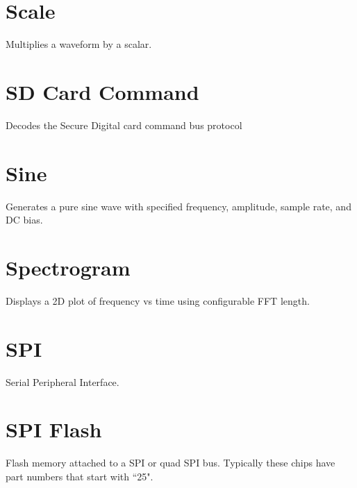 \section{Scale}

Multiplies a waveform by a scalar.

\pagebreak
\section{SD Card Command}

Decodes the Secure Digital card command bus protocol

\pagebreak
\section{Sine}

Generates a pure sine wave with specified frequency, amplitude, sample rate, and DC bias.

\pagebreak
\section{Spectrogram}

Displays a 2D plot of frequency vs time using configurable FFT length.

\pagebreak
\section{SPI}

Serial Peripheral Interface.

\pagebreak
\section{SPI Flash}

Flash memory attached to a SPI or quad SPI bus. Typically these chips have part numbers that start with ``25".

